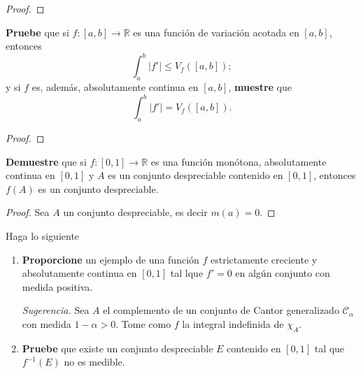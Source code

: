 \documentclass[12pt]{report}
\theoremstyle{largebreak}
\newcommand\abs[1]{\ensuremath{\lvert#1\rvert}}
\newcommand\cf[3]{\ensuremath{#1:#2\rightarrow#3}}
\begin{document}
    \begin{proof}
        
    \end{proof}

    \begin{excer}
        \textbf{Pruebe} que si $\cf{f}{[a,b]}{\mathbb{R}}$ es una función de variación acotada en $[a,b]$, entonces
        \begin{equation*}
            \int_{a}^{b}\abs{f'}\leq V_f([a,b]);
        \end{equation*}
        y si $f$ es, además, absolutamente continua en $[a,b]$, \textbf{muestre} que
        \begin{equation*}
            \int_{a}^{b}\abs{f'}=V_f([a,b]).
        \end{equation*}
    \end{excer}

    \begin{proof}
        
    \end{proof}

    \begin{excer}
        \textbf{Demuestre} que si $\cf{f}{[0,1]}{\mathbb{R}}$ es una función monótona, absolutamente continua en $[0,1]$ y $A$ es un conjunto despreciable contenido en $[0,1]$, entonces $f(A)$ es un conjunto despreciable.
    \end{excer}

    \begin{proof}
        Sea $A$ un conjunto despreciable, es decir $m\left(a\right)=0$.
    \end{proof}

    \begin{excer}
        Haga lo siguiente
        \begin{enumerate}
            \item \textbf{Proporcione} un ejemplo de una función $f$ estrictamente creciente y absolutamente continua en $[0,1]$ tal lque $f'=0$ en algún conjunto con medida positiva.
            
            \textit{Sugerencia.} Sea $A$ el complemento de un conjunto de Cantor generalizado $\mathscr{C}_\alpha$ con medida $1-\alpha>0$. Tome como $f$ la integral indefinida de $\chi_A$.
            \item \textbf{Pruebe} que existe un conjunto despreciable $E$ contenido en $[0,1]$ tal que $f^{-1}(E)$ no es medible.
        \end{enumerate}
    \end{excer}
\end{document}
